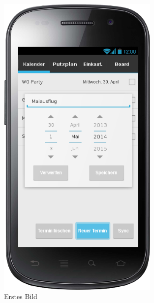 \begin{figure}[htbp] 
  \centering
     \includegraphics[width=0.7\textwidth]{anhang/mockups/kalenderneuertermin.png}
  \caption{Erstes Bild}
  \label{fig:Bild1}
\end{figure}


